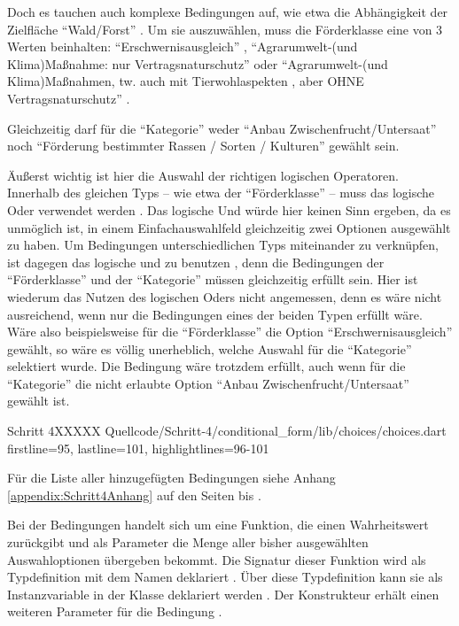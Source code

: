 Doch es tauchen auch komplexe Bedingungen auf,
wie etwa die Abhängigkeit der Zielfläche \enquote{Wald/Forst} \Lst{\ref{lst:Schritt4wald}}.
Um sie auszuwählen,
muss die Förderklasse eine von 3 Werten beinhalten:
\enquote{Erschwernisausgleich} ,
\enquote{Agrarumwelt-(und Klima)Maßnahme: nur Vertragsnaturschutz}  oder
\enquote{Agrarumwelt-(und Klima)Maßnahmen, tw. auch mit Tierwohlaspekten , aber OHNE Vertragsnaturschutz} .

Gleichzeitig darf für die \enquote{Kategorie} weder
\enquote{Anbau Zwischenfrucht/Untersaat} 
noch
\enquote{Förderung bestimmter Rassen / Sorten / Kulturen} 
gewählt sein.

Äußerst wichtig ist hier die Auswahl der richtigen logischen Operatoren.
Innerhalb des gleichen Typs -- wie etwa der \enquote{Förderklasse} -- muss das logische Oder \IC{||} verwendet werden .
Das logische Und würde hier keinen Sinn ergeben,
da es unmöglich ist,
in einem Einfachauswahlfeld gleichzeitig zwei Optionen ausgewählt zu haben.
Um Bedingungen unterschiedlichen Typs miteinander zu verknüpfen,
ist dagegen das logische und \IC{&&} zu benutzen ,
denn die Bedingungen der \enquote{Förderklasse} und der \enquote{Kategorie} müssen gleichzeitig erfüllt sein.
Hier ist wiederum das Nutzen des logischen Oders nicht angemessen, denn es wäre nicht ausreichend,
wenn nur die Bedingungen eines der beiden Typen erfüllt wäre.
Wäre also beispielsweise für die \enquote{Förderklasse} die Option \enquote{Erschwernisausgleich} gewählt,
so wäre es völlig unerheblich,
welche Auswahl für die \enquote{Kategorie} selektiert wurde.
Die Bedingung wäre trotzdem erfüllt,
auch wenn für die \enquote{Kategorie} die nicht erlaubte Option \enquote{Anbau Zwischenfrucht/Untersaat} gewählt ist.

\begin{alexlisting}{Schritt 4}{XXXXX}
  {Quellcode/Schritt-4/conditional_form/lib/choices/choices.dart}
  {firstline=95, lastline=101, highlightlines={96-101}}
  \label{lst:Schritt4wald}
\end{alexlisting}

Für die Liste aller hinzugefügten Bedingungen siehe Anhang \ref{appendix:Schritt4Anhang} auf den Seiten \pageref{lst:Schritt4KategorieChoice} bis  \pageref{lst:Schritt4ZieleinheitChoice}.

Bei der Bedingungen handelt sich um eine Funktion,
die einen Wahrheitswert  zurückgibt und als Parameter die Menge aller bisher ausgewählten Auswahloptionen  übergeben bekommt.
Die Signatur dieser Funktion wird als Typdefinition mit dem Namen  deklariert .
Über diese Typdefinition kann sie als Instanzvariable in der Klasse  deklariert werden .
Der Konstrukteur erhält einen weiteren Parameter für die Bedingung .

